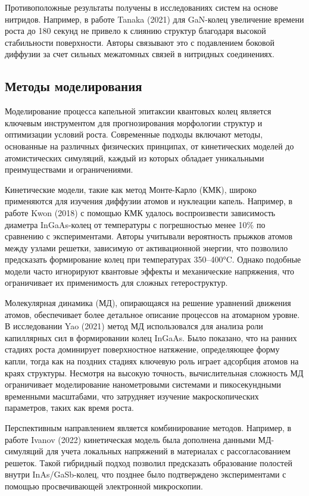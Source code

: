 \documentclass[14pt,oneside]{extarticle}
\begin{document}
Противоположные результаты получены в исследованиях систем на основе нитридов. Например, в работе Tanaka (2021) 
для GaN-колец увеличение времени роста до 180 секунд не привело к слиянию структур благодаря высокой стабильности поверхности. Авторы связывают это с подавлением боковой диффузии за счет сильных межатомных связей в нитридных соединениях.

\subsection{Методы моделирования}

Моделирование процесса капельной эпитаксии квантовых колец является ключевым инструментом для прогнозирования морфологии структур и оптимизации условий роста. Современные подходы включают методы, основанные на различных физических принципах, от кинетических моделей до атомистических симуляций, каждый из которых обладает уникальными преимуществами и ограничениями.

Кинетические модели, такие как метод Монте-Карло (КМК), широко применяются для изучения диффузии атомов и нуклеации капель. Например, в работе Kwon (2018) 
с помощью КМК удалось воспроизвести зависимость диаметра InGaAs-колец от температуры с погрешностью менее 10\% по сравнению с экспериментами. Авторы учитывали вероятность прыжков атомов между узлами решетки, зависимую от активационной энергии, что позволило предсказать формирование колец при температурах 350–400°C. Однако подобные модели часто игнорируют квантовые эффекты и механические напряжения, что ограничивает их применимость для сложных гетероструктур.

Молекулярная динамика (МД), опирающаяся на решение уравнений движения атомов, обеспечивает более детальное описание процессов на атомарном уровне. В исследовании Yao (2021) 
метод МД использовался для анализа роли капиллярных сил в формировании колец InGaAs. Было показано, что на ранних стадиях роста доминирует поверхностное натяжение, определяющее форму капли, тогда как на поздних стадиях ключевую роль играет адсорбция атомов на краях структуры. Несмотря на высокую точность, вычислительная сложность МД ограничивает моделирование нанометровыми системами и пикосекундными временными масштабами, что затрудняет изучение макроскопических параметров, таких как время роста.

Перспективным направлением является комбинирование методов. Например, в работе Ivanov (2022) 
кинетическая модель была дополнена данными МД-симуляций для учета локальных напряжений в материалах с рассогласованием решеток. Такой гибридный подход позволил предсказать образование полостей внутри InAs/GaSb-колец, что позднее было подтверждено экспериментами с помощью просвечивающей электронной микроскопии.
\end{document}
